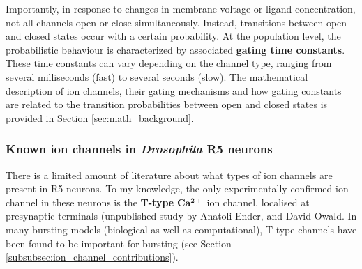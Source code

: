 \documentclass[../main.tex]{subfiles}
\begin{document}
Importantly, in response to changes in membrane voltage or ligand concentration, not all channels open or close simultaneously. Instead, transitions between open and closed states occur with a certain probability. At the population level, the probabilistic behaviour is characterized by associated \textbf{gating time constants}. These time constants can vary depending on the channel type, ranging from several milliseconds (fast) to several seconds (slow). The mathematical description of ion channels, their gating mechanisms and how gating constants are related
to the transition probabilities between open and closed states is provided in Section \ref{sec:math_background}.





\subsubsection{Known ion channels in \textit{Drosophila} R5 neurons} \label{subsubsect:known_channels_in_r5}
There is a limited amount of literature about what types of ion channels are present in R5 neurons. To my knowledge, the only experimentally confirmed ion channel in these neurons is the \textbf{T-type} \( \mathbf{Ca^{2+}} \) ion channel, localised at presynaptic terminals (unpublished study by Anatoli Ender, and David Owald. In many bursting models (biological as well as computational), T-type channels have been found to be important for bursting (see Section \ref{subsubsec:ion_channel_contributions}).
\end{document}
